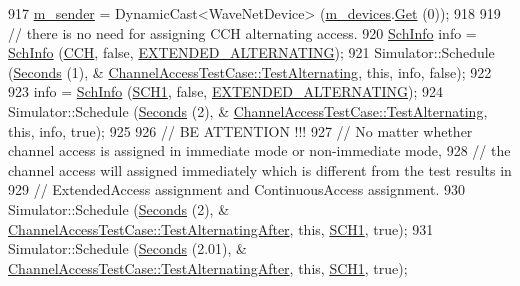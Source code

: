 \begin{DoxyCode}
917     \hyperlink{classChannelAccessTestCase_af2ed348403976d1e39d0099313ed3680}{m\_sender} = DynamicCast<WaveNetDevice> (\hyperlink{classChannelAccessTestCase_a36ad5644e4eb713b912aed42eb3fe4dc}{m\_devices}.\hyperlink{classns3_1_1NetDeviceContainer_a677d62594b5c9d2dea155cc5045f4d0b}{Get} (0));
918 
919     \textcolor{comment}{// there is no need for assigning CCH alternating  access.}
920     \hyperlink{structns3_1_1SchInfo}{SchInfo} info = \hyperlink{structns3_1_1SchInfo}{SchInfo} (\hyperlink{channel-manager_8h_a52d2f169cde2f6abe66ecc83f0d7ad80}{CCH}, \textcolor{keyword}{false}, \hyperlink{channel-scheduler_8h_a0e1f74c3cb8f78904dd1ae957412392e}{EXTENDED\_ALTERNATING});
921     Simulator::Schedule (\hyperlink{group__timecivil_ga33c34b816f8ff6628e33d5c8e9713b9e}{Seconds} (1), &
      \hyperlink{classChannelAccessTestCase_a0a581ae6f9c8e9f1317bdcf7e0e95936}{ChannelAccessTestCase::TestAlternating}, \textcolor{keyword}{this}, info, \textcolor{keyword}{false});
922 
923     info = \hyperlink{structns3_1_1SchInfo}{SchInfo} (\hyperlink{channel-manager_8h_a456a1b730523e5d3b8a29fb227d10028}{SCH1}, \textcolor{keyword}{false}, \hyperlink{channel-scheduler_8h_a0e1f74c3cb8f78904dd1ae957412392e}{EXTENDED\_ALTERNATING});
924     Simulator::Schedule (\hyperlink{group__timecivil_ga33c34b816f8ff6628e33d5c8e9713b9e}{Seconds} (2), &
      \hyperlink{classChannelAccessTestCase_a0a581ae6f9c8e9f1317bdcf7e0e95936}{ChannelAccessTestCase::TestAlternating}, \textcolor{keyword}{this}, info, \textcolor{keyword}{true});
925 
926     \textcolor{comment}{// BE ATTENTION !!!}
927     \textcolor{comment}{// No matter whether channel access is assigned in immediate mode or non-immediate mode,}
928     \textcolor{comment}{// the channel access will assigned immediately which is different from the test results in}
929     \textcolor{comment}{// ExtendedAccess assignment and ContinuousAccess assignment.}
930     Simulator::Schedule (\hyperlink{group__timecivil_ga33c34b816f8ff6628e33d5c8e9713b9e}{Seconds} (2), &
      \hyperlink{classChannelAccessTestCase_a1cddefa81cd70fd30ccdfe826ac4e85f}{ChannelAccessTestCase::TestAlternatingAfter}, \textcolor{keyword}{this}, 
      \hyperlink{channel-manager_8h_a456a1b730523e5d3b8a29fb227d10028}{SCH1}, \textcolor{keyword}{true});
931     Simulator::Schedule (\hyperlink{group__timecivil_ga33c34b816f8ff6628e33d5c8e9713b9e}{Seconds} (2.01), &
      \hyperlink{classChannelAccessTestCase_a1cddefa81cd70fd30ccdfe826ac4e85f}{ChannelAccessTestCase::TestAlternatingAfter}, \textcolor{keyword}{this}, 
      \hyperlink{channel-manager_8h_a456a1b730523e5d3b8a29fb227d10028}{SCH1}, \textcolor{keyword}{true});

\end{DoxyCode}
